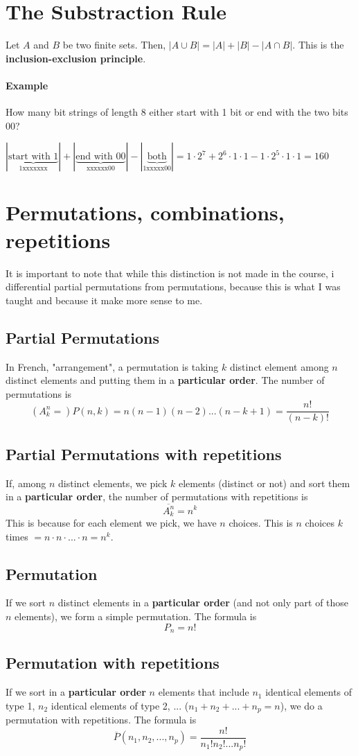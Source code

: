 \documentclass[10pt,a4paper]{book}
\begin{document}
\section{The Substraction Rule}
Let $A$ and $B$ be two finite sets. Then, $|A\cup B|=|A|+|B|-|A\cap B|$. This is the \textbf{inclusion-exclusion principle}.
\paragraph*{Example}
How many bit strings of length 8 either start with 1 bit or end with the two bits 00?\par 
$|\underbrace{\text{start with 1}}_{\text{1xxxxxxx}}|+|\underbrace{\text{end with 00}}_{\text{xxxxxx00}}|-|\underbrace{\text{both}}_{\text{1xxxxx00}}| = 1\cdot 2^7+2^6\cdot 1\cdot 1-1\cdot 2^5\cdot 1\cdot 1 = 160$
\section{Permutations, combinations, repetitions}
It is important to note that while this distinction is not made in the course, i differential partial permutations from permutations, because this is what I was taught and because it make more sense to me. 
\subsection{Partial Permutations}
In French, "arrangement", a permutation is taking $k$ distinct element among $n$ distinct elements and putting them in a \textbf{particular order}. The number of permutations is 
\[(A^n_k=)P(n,k) = n(n-1)(n-2)...(n-k+1)=\frac{n!}{(n-k)!}\] 
\subsection*{Partial Permutations with repetitions}
If, among $n$ distinct elements, we pick $k$ elements (distinct or not) and sort them in a \textbf{particular order}, the number of permutations with repetitions is
\[\overline{A^n_k}=n^k\]
This is because for each element we pick, we have $n$ choices. This is $n$ choices $k$ times $=n\cdot n\cdot ...\cdot n=n^k$.
\subsection{Permutation}
If we sort $n$ distinct elements in a \textbf{particular order} (and not only part of those $n$ elements), we form a simple permutation. The formula is 
\[P_n = n!\]
\subsection*{Permutation with repetitions}
If we sort in a \textbf{particular order} $n$ elements that include $n_1$ identical elements of type 1, $n_2$ identical elements of type 2, ... ($n_1+n_2+...+n_p=n$), we do a permutation with repetitions. The formula is
\[\overline{P}(n_1,n_2,...,n_p)=\frac{n!}{n_1!n_2!...n_p!}\]
\end{document}
